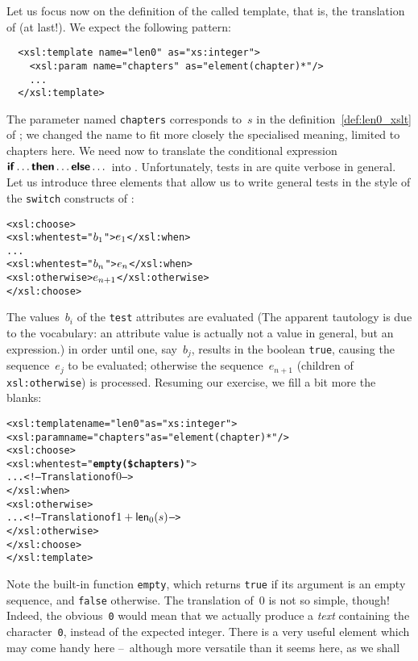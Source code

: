 Let us focus now on the definition of the called template, that is,
the translation of  (at last!). We expect the
following pattern:
\begin{verbatim}
  <xsl:template name="len0" as="xs:integer">
    <xsl:param name="chapters" as="element(chapter)*"/>
    ...
  </xsl:template>
\end{verbatim}
The parameter named \texttt{chapters} corresponds to~\(s\) in the
definition~\eqref{def:len0_xslt} of ; we changed the
name to fit more closely the specialised meaning, limited to chapters
here. We need now to translate the conditional expression \(\textsf{\textbf{if}}
\dots \textsf{\textbf{then}} \dots \textsf{\textbf{else}} \dots\) into \XSLT. Unfortunately,
tests in \XSLT are quite verbose in general. Let us introduce three
elements that allow us to write general tests in the style of the
\texttt{switch} constructs of \Java:
\begin{alltt}
<xsl:choose>
  <xsl:when test="\(b\sb{1}\)">\(e\sb{1}\)</xsl:when>
  ...
  <xsl:when test="\(b\sb{n}\)">\(e\sb{n}\)</xsl:when>
  <xsl:otherwise>\(e\sb{n+1}\)</xsl:otherwise>
</xsl:choose>
\end{alltt}
The values~\(b_i\) of the \texttt{test} attributes are evaluated (The
apparent tautology is due to the \XSLT vocabulary: an attribute value
is actually not a value in general, but an expression.) in order until
one, say~\(b_j\), results in the boolean \texttt{true}, causing the
sequence~\(e_j\) to be evaluated; otherwise the sequence~\(e_{n+1}\)
(children of \texttt{xsl:otherwise}) is processed. Resuming our
exercise, we fill a bit more the blanks:
\begin{alltt}
  <xsl:template name="len0" as="xs:integer">
    <xsl:param name="chapters" as="element(chapter)*"/>
    <xsl:choose>
      <xsl:when test="\textbf{empty(\$chapters)}">
        ... <!-- Translation of \(0\) -->
      </xsl:when>
      <xsl:otherwise>
        ... <!-- Translation of \(1 + \fun{len}\sb{0}(s)\) -->
      </xsl:otherwise>
    </xsl:choose>
  </xsl:template>
\end{alltt}
Note the built\hyp{}in \XSLT function \texttt{empty}, which returns
\texttt{true} if its argument is an empty sequence, and \texttt{false}
otherwise. The translation of~\(0\) is not so simple, though! Indeed,
the obvious~\texttt{0} would mean that we actually produce a
\emph{text} containing the character~\texttt{0}, instead of the
expected integer. There is a very useful \XSLT element which may come
handy here --~although more versatile than it seems here, as we shall

